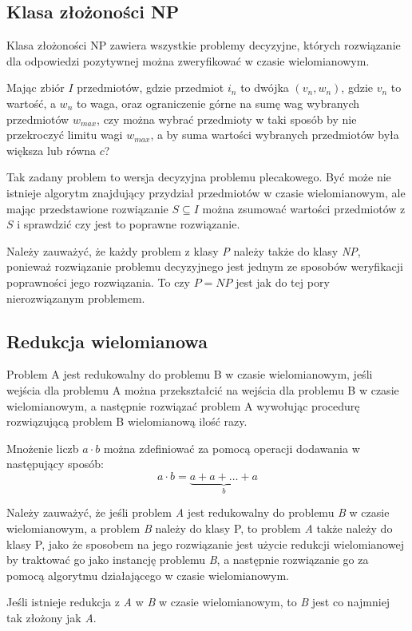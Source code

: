 \subsection{Klasa złożoności NP}
\begin{definition}
    Klasa złożoności NP zawiera wszystkie problemy decyzyjne, których rozwiązanie dla odpowiedzi pozytywnej
można zweryfikować w czasie wielomianowym.
\end{definition}
\begin{example}
    Mając zbiór $I$ przedmiotów, gdzie przedmiot $i_n$ to dwójka $(v_n, w_n)$, gdzie $v_n$ to wartość,
a $w_n$ to waga, oraz ograniczenie górne na sumę wag wybranych przedmiotów $w_{max}$, czy można
wybrać przedmioty w taki sposób by nie przekroczyć limitu wagi $w_{max}$, a by suma wartości
wybranych przedmiotów była większa lub równa $c$?

    Tak zadany problem to wersja decyzyjna problemu plecakowego. Być może nie istnieje algorytm znajdujący
przydział przedmiotów w czasie wielomianowym, ale mając przedstawione rozwiązanie $S \subseteq I$
można zsumować wartości przedmiotów z $S$ i sprawdzić czy jest to poprawne rozwiązanie.
\end{example}

    Należy zauważyć, że każdy problem z klasy \textit{P} należy także do klasy \textit{NP}, ponieważ
rozwiązanie problemu decyzyjnego jest jednym ze sposobów weryfikacji poprawności jego rozwiązania.
To czy $P = NP$ jest jak do tej pory nierozwiązanym problemem.


\subsection{Redukcja wielomianowa}
\begin{definition}
    Problem A jest redukowalny do problemu B w czasie wielomianowym, jeśli wejścia dla problemu A
można przekształcić na wejścia dla problemu B w czasie wielomianowym, a następnie rozwiązać problem A
wywołując procedurę rozwiązującą problem B wielomianową ilość razy.
\end{definition}
\begin{example}
    Mnożenie liczb $a \cdot b$ można zdefiniować za pomocą operacji dodawania w następujący sposób:
$$a \cdot b = \underbrace{a + a + \ldots + a}_{b}$$
\end{example}
    Należy zauważyć, że jeśli problem \textit{A} jest redukowalny do problemu \textit{B} w czasie wielomianowym,
a problem \textit{B} należy do klasy P, to problem \textit{A} także należy do klasy P, jako że
sposobem na jego rozwiązanie jest użycie redukcji wielomianowej by traktować go jako instancję problemu \textit{B},
a następnie rozwiązanie go za pomocą algorytmu działającego w czasie wielomianowym.
\begin{corollary}
    Jeśli istnieje redukcja z \textit{A} w \textit{B} w czasie wielomianowym, to \textit{B} jest
co najmniej tak złożony jak \textit{A}.
\end{corollary}


